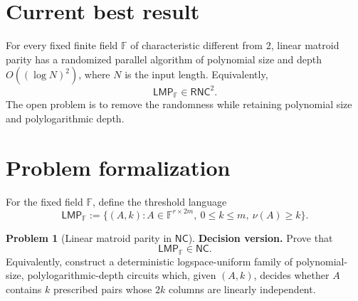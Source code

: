 \documentclass[10pt,a4paper]{article}
\theoremstyle{definition}
\newtheorem*{problem*}{Problem}
\begin{document}
\section{Current best result}

For every fixed finite field $\mathbb F$ of characteristic different from $2$, linear matroid
parity has a randomized parallel algorithm of polynomial size and depth
$O((\log N)^2)$, where $N$ is the input length. Equivalently,
\begin{equation}
  \mathsf{LMP}_{\mathbb F}\in\mathsf{RNC}^2.
\end{equation}
The open problem is to remove the randomness while retaining polynomial size
and polylogarithmic depth.

\section{Problem formalization}
For the fixed field $\mathbb F$, define the threshold language
\begin{equation}
  \mathsf{LMP}_{\mathbb F}
  :=\bigl\{(A,k):A\in\mathbb F^{r\times 2m},\ 0\leq k\leq m,\
  \nu(A)\geq k\bigr\}.
\end{equation}


\begin{problem*}[Linear matroid parity in $\mathsf{NC}$]
\textbf{Decision version.}
Prove that
\begin{equation}
  \mathsf{LMP}_{\mathbb F}\in\mathsf{NC}.
\end{equation}
Equivalently, construct a deterministic logspace-uniform family of
polynomial-size, polylogarithmic-depth circuits which, given $(A,k)$, decides
whether $A$ contains $k$ prescribed pairs whose $2k$ columns are linearly
independent.
\end{problem*}
\end{document}
